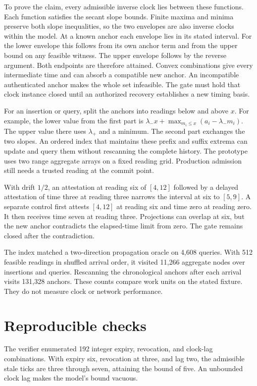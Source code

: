 \documentclass[11pt]{article}
\begin{document}
To prove the claim, every admissible inverse clock lies between
these functions. Each function satisfies the secant slope bounds.
Finite maxima and minima preserve both slope inequalities, so the
two envelopes are also inverse clocks within the model. At a known
anchor each envelope lies in its stated interval. For the lower
envelope this follows from its own anchor term and from the upper
bound on any feasible witness. The upper envelope follows by the
reverse argument. Both endpoints are therefore attained. Convex
combinations give every intermediate time and can absorb a compatible
new anchor. An incompatible authenticated anchor makes the whole
set infeasible. The gate must hold that clock instance closed until
an authorized recovery establishes a new timing basis.

For an insertion or query, split the anchors into readings below
and above $x$. For example, the lower value from the first part
is $\lambda_-x+\max_{m_i\le x}(a_i-\lambda_-m_i)$.
The upper value there uses $\lambda_+$ and a minimum. The second
part exchanges the two slopes. An ordered index that maintains
these prefix and suffix extrema can update and query them without
rescanning the complete history. The prototype uses two range
aggregate arrays on a fixed reading grid. Production admission
still needs a trusted reading at the commit point.

With drift $1/2$, an attestation at reading six of $[4,12]$
followed by a delayed attestation of time three at reading three
narrows the interval at six to $[5,9]$. A separate control first
attests $[4,12]$ at reading six and time zero at reading zero.
It then receives time seven at reading three. Projections can
overlap at six, but the new anchor contradicts the elapsed-time
limit from zero. The gate remains closed after the contradiction.

The index matched a two-direction propagation oracle on 4,608
queries. With 512 feasible readings in shuffled arrival order,
it visited 11,266 aggregate nodes over insertions and queries.
Rescanning the chronological anchors after each arrival visits
131,328 anchors. These counts compare work units on the stated
fixture. They do not measure clock or network performance.

\section{Reproducible checks}
The verifier enumerated 192 integer expiry, revocation, and clock-lag combinations. With expiry six, revocation at three, and lag two, the admissible stale ticks are three through seven, attaining the bound of five. An unbounded clock lag makes the model's bound vacuous.
\end{document}
